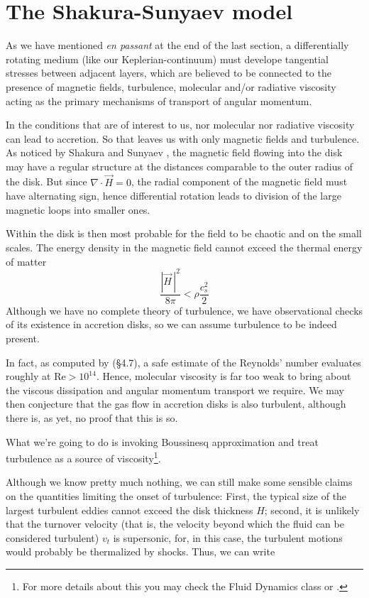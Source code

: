 \section{The Shakura-Sunyaev model}
As we have mentioned \emph{en passant} at the end of the last section, a differentially rotating medium (like our Keplerian-continuum) must develope tangential stresses between adjacent layers, which are believed to be connected to the presence of magnetic fields, turbulence, molecular and/or radiative viscosity acting as the primary mechanisms of transport of angular momentum.
\par In the conditions that are of interest to us, nor molecular nor radiative viscosity can lead to accretion. So that leaves us with only magnetic fields and turbulence. As noticed by Shakura and Sunyaev \cite{1973A&A....24..337S}, the magnetic field flowing into the disk may have a regular structure at the distances comparable to the outer radius of the disk. But since $\nabla\cdot\vec{H} = 0$, the radial component of the magnetic field must have alternating sign, hence differential rotation leads to division of the large magnetic loops into smaller ones.
\par Within the disk is then most probable for the field to be chaotic and on the small scales. The energy density in the magnetic field cannot exceed the thermal energy of matter 
\begin{equation*}
    \frac{|\vec{H}\,|^{2}}{8\pi} < \rho\frac{c_{s}^{2}}{2}
\end{equation*}
Although we have no complete theory of turbulence, we have observational checks of its existence in accretion disks, so we can assume turbulence to be indeed present.
\par In fact, as computed by \cite{Frank_King_Raine_2002} (§4.7), a safe estimate of the Reynolds' number evaluates roughly at $\text{Re} > 10^{14}$. Hence, molecular viscosity is far too weak to bring about the viscous dissipation and angular momentum transport we require. We may then conjecture that the gas flow in accretion disks is also turbulent, although there is, as yet, no proof that this is so.
\par What we're going to do is invoking Boussinesq approximation and treat turbulence as a source of viscosity\footnote{For more details about this you may check the Fluid Dynamics class or \cite{Pope_2000}.}.
\par Although we know pretty much nothing, we can still make some sensible claims on the quantities limiting the onset of turbulence: First, the typical size of the largest turbulent eddies cannot exceed the disk thickness $H$; second, it is unlikely that the turnover velocity (that is, the velocity beyond which the fluid can be considered turbulent) $v_{t}$ is supersonic, for, in this case, the turbulent motions would probably be thermalized by shocks. Thus, we can write 
